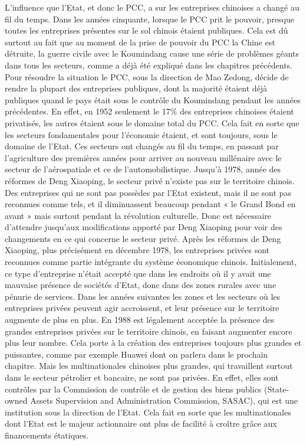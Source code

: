 L’influence que l’Etat, et donc le PCC, a sur les entreprises chinoises a changé au fil du temps. Dans les années cinquante, lorsque le PCC prit le pouvoir, presque toutes les entreprises présentes sur le sol chinois étaient publiques. Cela est dû surtout au fait que au moment de la prise de pouvoir du PCC la Chine est détruite, la guerre civile avec le Koumindang cause une série de problèmes géants dans tous les secteurs, comme a déjà été expliqué dans les chapitres précédents. Pour résoudre la situation le PCC, sous la direction de Mao Zedong, décide de rendre la plupart des entreprises publiques, dont la majorité étaient déjà publiques quand le pays était sous le contrôle du Koumindang pendant les années précédentes.  En effet, en 1952 seulement le 17\% des entreprises chinoises étaient privatisés, les autres étaient sous le domaine total du PCC.   Cela fait en sorte que les secteurs fondamentales pour l’économie étaient, et sont toujours, sous le domaine de l’Etat.  Ces secteurs ont changés au fil du temps, en passant par l’agriculture des premières années pour arriver au nouveau millénaire avec le secteur de l’aérospatiale et ce de l’automobilistique.  Jusqu’à 1978, année des réformes de Deng Xiaoping, le secteur privé n’existe pas sur le territoire chinois.  Des entreprises qui ne sont pas possèdes par l’Etat existent, mais il ne sont pas reconnues comme tels, et il diminuassent beaucoup pendant « le Grand Bond en avant » mais surtout pendant la révolution culturelle.  Donc est nécessaire d’attendre jusqu’aux modifications apporté par Deng Xiaoping pour voir des changements en ce qui concerne le secteur privé.  Après les réformes de Deng Xiaoping, plus précisément en décembre 1978, les entreprises privées sont reconnues comme partie intégrante du système économique chinois.  Initialement, ce type d’entreprise n’était accepté que dans les endroits où il y avait une mauvaise présence de sociétés d’Etat, donc dans des zones rurales avec une pénurie de services.  Dans les années suivantes les zones et les secteurs où les entreprises privées peuvent agir accroissent, et leur présence sur le territoire augmente de plus en plus. En 1988 est légalement acceptée la présence des grandes entreprises privées sur le territoire chinois, en faisant augmenter encore plus leur nombre.  Cela porte à la création des entreprises toujours plus grandes et puissantes, comme par exemple Huawei dont on parlera dans le prochain chapitre. Mais les multinationales chinoises plus grandes, qui travaillent surtout dans le secteur pétrolier et bancaire, ne sont pas privées.  En effet, elles sont contrôles par la Commission de contrôle et de gestion des biens publics (State-owned Assets Supervision and Administration Commission, SASAC),  qui est une institution sous la direction de l’Etat.  Cela fait en sorte que les multinationales dont l’Etat est le majeur actionnaire ont plus de facilité à croître grâce aux financements étatiques. 
